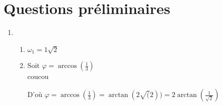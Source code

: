 \section{Questions préliminaires}
\begin{enumerate}
    \item \begin{enumerate}
              \item  $\omega_1 = 1\sqrt{2}$
              \item
                    Soit $\varphi = \arccos{(\frac{1}{3})}$\\
                    coucou
                    \begin{result}
                        D'où $
                                \varphi
                                = \arccos{(\frac{1}{3})}
                                = \arctan{(2\sqrt(2))}
                                = 2\arctan{(\frac{1}{\sqrt{2}})}
                            $
                    \end{result}

          \end{enumerate}{}
\end{enumerate}{}
